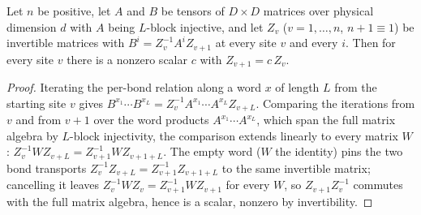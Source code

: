 \begin{lemma}%
    \label{lem:gaugeFamily_succ_proportional}
    \leanok
    Let $n$ be positive, let $A$ and $B$ be tensors of $D \times D$ matrices
    over physical dimension $d$ with $A$ being $L$-block injective, and let
    $Z_v$ ($v = 1, \ldots, n$, $n + 1 \equiv 1$) be invertible matrices with
    $B^i = Z_v^{-1} A^i Z_{v+1}$ at every site $v$ and every $i$.  Then for
    every site $v$ there is a nonzero scalar $c$ with $Z_{v+1} = c\,Z_v$.
\end{lemma}
\begin{proof}\leanok
    Iterating the per-bond relation along a word $x$ of length $L$ from the
    starting site $v$ gives
    $B^{x_1} \cdots B^{x_L} = Z_v^{-1} A^{x_1} \cdots A^{x_L} Z_{v+L}$.
    Comparing the iterations from $v$ and from $v + 1$ over the word
    products $A^{x_1} \cdots A^{x_L}$, which span the full matrix algebra by
    $L$-block injectivity, the comparison extends linearly to every matrix
    $W$: $Z_v^{-1} W Z_{v+L} = Z_{v+1}^{-1} W Z_{v+1+L}$.  The empty word
    ($W$ the identity) pins the two bond transports
    $Z_v^{-1} Z_{v+L} = Z_{v+1}^{-1} Z_{v+1+L}$ to the same invertible
    matrix; cancelling it leaves $Z_v^{-1} W Z_v = Z_{v+1}^{-1} W Z_{v+1}$
    for every $W$, so $Z_{v+1} Z_v^{-1}$ commutes with the full matrix
    algebra, hence is a scalar, nonzero by invertibility.
\end{proof}

